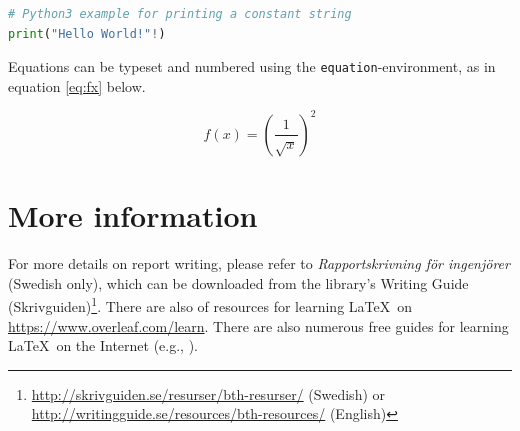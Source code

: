 \documentclass[12pt,a4paper]{article}
\begin{document}
\noindent
\begin{minipage}{\textwidth}
\begin{lstlisting}[frame=single,language=Python,basicstyle=\small,caption={Example of a code-listing.},label={lst:hello}]
# Python3 example for printing a constant string 
print("Hello World!"!)
\end{lstlisting}
\end{minipage}



Equations can be typeset and numbered using the \texttt{equation}-environment, as in equation \ref{eq:fx} below.

\begin{equation}
\label{eq:fx}
    f(x) = (\frac{1}{\sqrt{x}})^2
\end{equation}


\section{More information}
\label{sec:more}
For more details on report writing, please refer to \textit{Rapportskrivning för ingenjörer} \cite{nilsson2018rapport} (Swedish only), which can be downloaded from the library's Writing Guide (Skrivguiden)\footnote{\url{http://skrivguiden.se/resurser/bth-resurser/} (Swedish) or \url{http://writingguide.se/resources/bth-resources/} (English)}.  There are also of resources for learning \LaTeX\ on \url{https://www.overleaf.com/learn}. There are also numerous free guides for learning \LaTeX\ on the Internet (e.g., \cite{oetiker2011not}).

\small


\end{document}
